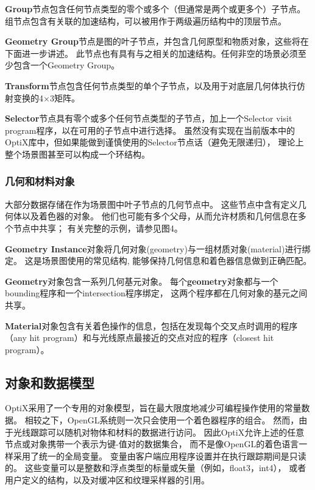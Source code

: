 \textbf{Group}节点包含任何节点类型的零个或多个（但通常是两个或更多个）子节点。
组节点包含有关联的加速结构，可以被用作于两级遍历结构中的顶层节点。

\textbf{Geometry Group}节点是图的叶子节点，并包含几何原型和物质对象，这些将在下面进一步讲述。
此节点也有具有与之相关的加速结构。任何非空的场景必须至少包含一个Geometry Group。

\textbf{Transform}节点包含任何节点类型的单个子节点，以及用于对底层几何体执行仿射变换的4×3矩阵。

\textbf{Selector}节点具有零个或多个任何节点类型的子节点，加上一个Selector visit program程序，以在可用的子节点中进行选择。
虽然没有实现在当前版本中的OptiX库中，但如果能做到谨慎使用的Selector节点话（避免无限递归），
理论上整个场景图甚至可以构成一个环结构。

\subsubsection{几何和材料对象}

大部分数据存储在作为场景图中叶子节点的几何节点中。
这些节点中含有定义几何体以及着色器的对象。
他们也可能有多个父母，从而允许材质和几何信息在多个节点中共享；
有关完整的示例，请参见图4。

\textbf{Geometry Instance}对象将几何对象(geometry)与一组材质对象(material)进行绑定。
这是场景图使用的常见结构, 能够保持几何信息和着色器信息做到正确匹配。

\textbf{Geometry}对象包含一系列几何基元对象。
每个\textbf{geometry}对象都与一个bounding程序和一个intersection程序绑定，
这两个程序都在几何对象的基元之间共享。

\textbf{Material}对象包含有关着色操作的信息，包括在发现每个交叉点时调用的程序
（any hit program）和与光线原点最接近的交点对应的程序（closest hit program）。

\subsection{对象和数据模型}

OptiX采用了一个专用的对象模型，旨在最大限度地减少可编程操作使用的常量数据。
相较之下，OpenGL系统则一次只会使用一个着色器程序的组合。
然而，由于光线跟踪可以随机对物体和材料的数据进行访问。
因此OptiX允许上述的任意节点或对象携带一个表示为键-值对的数据集合，
而不是像OpenGL的着色语言一样采用了统一的全局变量。
变量由客户端应用程序设置并在执行跟踪期间是只读的。
这些变量可以是整数和浮点类型的标量或矢量（例如，float3，int4），
或者用户定义的结构，以及对缓冲区和纹理采样器的引用。

